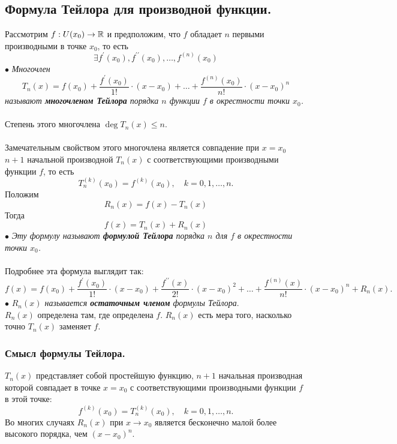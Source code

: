 	\subsection{Формула Тейлора для производной функции.}
	Рассмотрим $f:U(x_{0}) \rightarrow \mathbb{R}$ и предположим, что $f$ обладает $n$ первыми производными в точке $x_{0}$, то есть $$\exists f^\prime(x_{0}), f^{\prime\prime}(x_{0}), \ldots, f^{(n)}(x_{0})$$
	$\bullet$ \textit{Многочлен $$T_{n}(x) = f(x_{0}) + \frac{f^\prime(x_{0})}{1!}\cdot(x-x_{0})+\ldots+\frac{f^{(n)}(x_{0})}{n!}\cdot(x-x_{0})^n$$ называют \textbf{многочленом Тейлора} порядка $n$ функции $f$ в окрестности точки $x_{0}$.}\\\\
	Степень этого многочлена $\deg{T_{n}(x)} \leq n$.\\\\
	Замечательным свойством этого многочлена является совпадение при $x=x_{0}$ $n+1$ начальной производной $T_{n}(x)$ с соответствующими производными функции $f$, то есть $$T_{n}^{(k)}(x_{0}) = f^{(k)}(x_{0}),\quad k=0,1,\ldots,n.$$
	Положим $$R_{n}(x) = f(x) - T_{n}(x)$$
	Тогда $$f(x) = T_{n}(x) + R_{n}(x)$$
	$\bullet$\textit{ Эту формулу называют \textbf{формулой Тейлора}  порядка $n$ для $f$ в окрестности точки $x_{0}$.}\\\\
	Подробнее эта формула выглядит так: $$f(x)=f(x_{0})+\frac{f^\prime(x_{0})}{1!}\cdot(x-x_{0})+\frac{f^{\prime\prime}(x)}{2!}\cdot(x-x_{0})^2+\ldots+\frac{f^{(n)}(x)}{n!}\cdot(x-x_{0})^n+R_{n}(x).$$
	$\bullet$ \textit{$R_{n}(x)$ называется \textbf{остаточным членом} формулы Тейлора}.\\
	$R_{n}(x)$ определена там, где определена $f$.
	$R_{n}(x)$ есть мера того, насколько точно $T_{n}(x)$ заменяет $f$.
	\subsubsection{Смысл формулы Тейлора.}
	$T_{n}(x)$ представляет собой простейшую функцию, $n+1$ начальная производная которой совпадает в точке $x=x_{0}$ с соответствующими производными функции $f$ в этой точке: $$f^{(k)}(x_{0})=T^{(k)}_{n}(x_{0}),\quad k = 0, 1, \ldots, n.$$
	Во многих случаях $R_{n}(x)$ при $x \rightarrow x_{0}$ является бесконечно малой более высокого порядка, чем $(x-x_{0})^n$.
